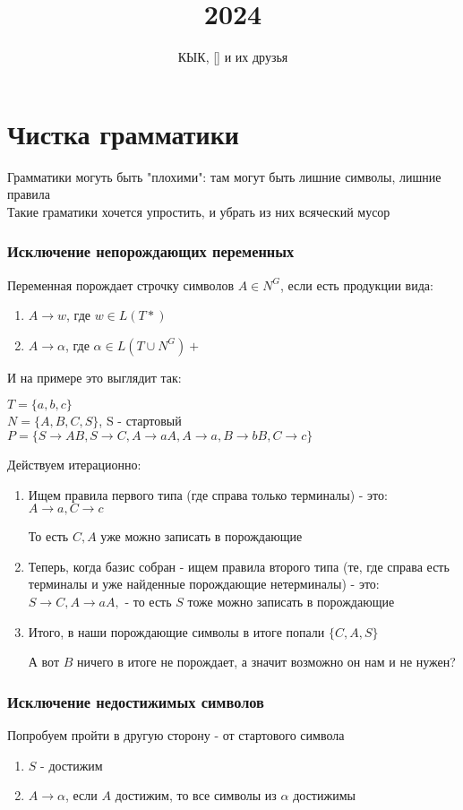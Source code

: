 \documentclass{article}
\title{2024}
\author{КЫК, [] и их друзья}
\begin{document}
\maketitle
\tableofcontents

\part{Чистка грамматики}
Грамматики могуть быть "плохими": там могут быть лишние символы, лишние правила\\
Такие граматики хочется упростить, и убрать из них всяческий мусор

\section{Исключение непорождающих переменных}
Переменная порождает строчку символов $A \in N^G$, если есть продукции вида:
\begin{enumerate}
  \item $ A \to w$, где $w \in L(T*)$
  \item $ A \to \alpha$, где $\alpha \in L(T\cup N^G)+$
\end{enumerate}
И на примере это выглядит так:
\begin{center}
$T = \{a,b,c\}$\\
$N = \{A,B,C,S\}$, S - стартовый\\
$P = \{ S \to AB, S \to C, A \to aA, A \to a, B \to bB, C \to c\}$
\end{center}
Действуем итерационно:

\begin{enumerate}
  \item Ищем правила первого типа (где справа только терминалы) - это: 
        $A \to a, C \to c$
            
    То есть $C, A$ уже можно записать в порождающие
    \item Теперь, когда базис собран - ищем правила второго типа 
    (те, где справа есть терминалы и уже найденные порождающие нетерминалы) - это:
    $S \to C, A \to aA, $ - то есть $S$ тоже можно записать в порождающие
    \item Итого, в наши порождающие символы в итоге попали $\{C,A,S\}$
    
    А вот $B$ ничего в итоге не порождает, а значит возможно он нам и не нужен?
\end{enumerate}

\section{Исключение недостижимых символов}
Попробуем пройти в другую сторону - от стартового символа
\begin{enumerate}
  \item $S$ - достижим
    \item $A \to \alpha$, если $A$ достижим, то все символы из $\alpha$ достижимы
\end{enumerate}
\end{document}

